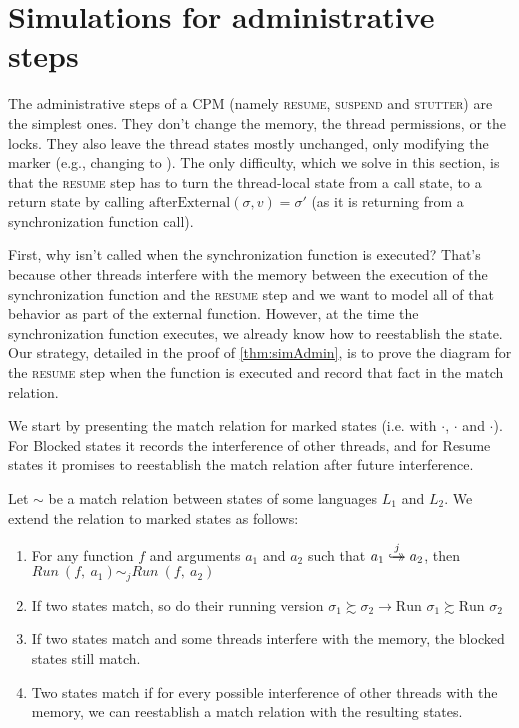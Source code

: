 \section{Simulations for administrative steps}\label{sec:simadmin}

The administrative steps of a CPM (namely \textsc{resume, suspend} and \textsc{stutter}) are the simplest ones. They don't change the memory, the thread permissions, or the locks. They also leave the thread states mostly unchanged, only modifying the marker (e.g., changing  to ). The only difficulty, which we solve in this section, is that the  \textsc{resume} step has to turn the thread-local state from a call state, to a return state by calling $\mathrm{afterExternal}(\sigma,v)=\sigma'$ (as it is returning from a synchronization function call). 

First, why isn't  called when the synchronization function is executed? That's because other threads interfere with the memory between the execution of the synchronization function and the \textsc{resume} step and we want to model all of that behavior as part of the external function. However, at the time the synchronization function executes, we already know how to reestablish the state. Our strategy, detailed in the proof of \cref{thm:simAdmin}, is to prove the diagram for the \textsc{resume} step when the function is executed and record that fact in the match relation.

We start by presenting the match relation for marked states (i.e. with  $\cdot$,  $\cdot$ and  $\cdot$). For Blocked states it records the interference of other threads, and for Resume states it promises to reestablish the match relation after future interference.

\begin{definition}\label{def:matchmarkedstates}
Let $\sim$ be a match relation between states of some languages $L_1$ and $L_2$. We extend the relation to marked states as follows:
\begin{enumerate}
\item[\matht{Init:}] For any function $f$ and arguments $a_1$ and $a_2$ such that $a_1 \overset{j}{\hookrightarrow\mathrel{\mspace{-15mu}}\rightarrow} a_2$, then  ${Run }\ (f,\ a_1) \sim_j {Run}\ (f,\ a_2)$
\item[\matht{Run:}] If two states match, so do their running version $ \sigma_1 \succsim \sigma_2 \rightarrow \text{Run } \sigma_1 \succsim \text{Run } \sigma_2$
\item[\matht{Resume:}] If two states match and some threads interfere with the memory, the blocked states still match. 
\item[\matht{Resume:}]  Two  states match if for every possible interference of other threads with the memory, we can reestablish a match relation with the resulting states. 
\end{enumerate}
\end{definition}

